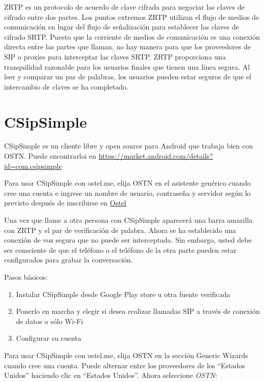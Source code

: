 \documentclass[10pt,a5paper,twoside,,]{book}
\providecommand{\tightlist}{%
  \setlength{\itemsep}{0pt}\setlength{\parskip}{0pt}}
\begin{document}
ZRTP es un protocolo de acuerdo de clave cifrada para negociar las
claves de cifrado entre dos partes. Los puntos extremos ZRTP utilizan el
flujo de medios de comunicación en lugar del flujo de señalización para
establecer las claves de cifrado SRTP. Puesto que la corriente de medios
de comunicación es una conexión directa entre las partes que llaman, no
hay manera para que los proveedores de SIP o proxies para interceptar
las claves SRTP. ZRTP proporciona una tranquilidad razonable para los
usuarios finales que tienen una línea segura. Al leer y comparar un par
de palabras, los usuarios pueden estar seguros de que el intercambio de
claves se ha completado.

\section{CSipSimple}\label{csipsimple}

CSipSimple es un cliente libre y open source para Android que trabaja
bien con OSTN. Puede encontrarloi en
\url{https://market.android.com/details?id=com.csipsimple}

Para usar CSipSimple con ostel.me, elija OSTN en el asistente genérico
cuando cree una cuenta e ingrese un nombre de usuario, contraseña y
servidor según lo previsto después de inscribirse en
\href{https://ostel.me/users/sign_up}{Ostel}

Una vez que llame a otra persona con CSipSimple aparecerá una barra
amarilla con ZRTP y el par de verificación de palabra. Ahora se ha
establecido una conexión de voz segura que no puede ser interceptada.
Sin embargo, usted debe ser consciente de que el teléfono o el teléfono
de la otra parte pueden estar configurados para grabar la conversación.

Pasos básicos:

\begin{enumerate}
\def\labelenumi{\arabic{enumi}.}
\tightlist
\item
  Instalar CSipSimple desde Google Play store u otra fuente verificada
\item
  Ponerlo en marcha y elegir si desea realizar llamadas SIP a través de
  conexión de datos o sólo Wi-Fi
\item
  Configurar su cuenta
\end{enumerate}

Para usar CSipSimple con ostel.me, elija OSTN en la sección Generic
Wizards cuando cree una cuenta. Puede alternar entre los proveedores de
los ``Estados Unidos'' haciendo clic en ``Estados Unidos''. Ahora
seleccione \emph{OSTN}:
\end{document}
